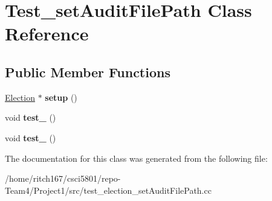 \hypertarget{classTest__setAuditFilePath}{}\section{Test\+\_\+set\+Audit\+File\+Path Class Reference}
\label{classTest__setAuditFilePath}
\subsection*{Public Member Functions}
\begin{DoxyCompactItemize}
\item 
\mbox{\label{classTest__setAuditFilePath_aac2bd4ed1451282684cfa3f92c59d41c}} 
\hyperlink{classElection}{Election} $\ast$ {\bfseries setup} ()
\item 
\mbox{\label{classTest__setAuditFilePath_ae6fe810f3c4381e8ddfb4838cda74dcb}} 
void {\bfseries test\+\_} ()
\item 
\mbox{\label{classTest__setAuditFilePath_a35ea43e2aee16894d36af595bf3e44b8}} 
void {\bfseries test\+\_} ()
\end{DoxyCompactItemize}


The documentation for this class was generated from the following file\+:\begin{DoxyCompactItemize}
\item 
/home/ritch167/csci5801/repo-\/\+Team4/\+Project1/src/test\+\_\+election\+\_\+set\+Audit\+File\+Path.\+cc\end{DoxyCompactItemize}
